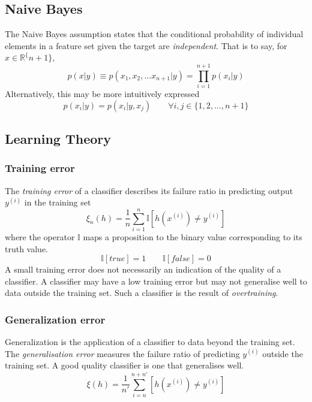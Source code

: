 \documentclass{article}
\theoremstyle{definition}
\theoremstyle{remark}
\begin{document}
\subsection{Naive Bayes}
The Naive Bayes assumption states that the conditional probability of individual elements in a feature set given the target are \textit{independent}.
That is to say, for $x\in\mathbb{R}^\{ n + 1 \}$,
\begin{equation}
  p(x|y) \equiv p(x_{1}, x_{2}, \dots x_{n+1}| y) = \prod_{i = 1}^{n+1}p(x_{i}|y)
  \label{eqn:naivebayesassumption}
\end{equation}
Alternatively, this may be more intuitively expressed 
\begin{equation}
  p(x_{i}|y) = p(x_{i}|y, x_{j}) \qquad \forall i,j \in \{1, 2, \dots, n + 1\}
  \label{eqn:intuitivenaivebayes}
\end{equation}

\subsection{Learning Theory}
\subsubsection{Training error}
The \textit{training error} of a classifier describes its failure ratio in predicting output $y^{(i)}$ in the training set
\begin{equation}
  \xi_{n}(h) = \frac{1}{n} \sum_{i=1}^{n} \mathbb{I}\left[ h(x^{(i)}) \neq y^{(i)}\right]
\end{equation}
where the operator $\mathbb{I}$ maps a proposition to the binary value corresponding to its truth value.
\[
  \mathbb{I}\left[true\right] = 1 \qquad \mathbb{I}\left[false\right] = 0
\]
A small training error does not necessarily an indication of the quality of a classifier. 
A classifier may have a low training error but may not generalise well to data outside the training set. Such a classifier is the result of \textit{overtraining}.
\subsubsection{Generalization error}
Generalization is the application of a classifier to data beyond the training set. 
The \textit{generalisation error} measures the failure ratio of predicting $y^{(i)}$ outside the training set.
A good quality classifier is one that generalises well.
\begin{equation}
  \xi (h) = \frac{1}{n'} \sum_{i = n}^{n + n'} \left[ h(x^{(i)}) \neq y^{(i)}\right]
\end{equation}
\end{document}
